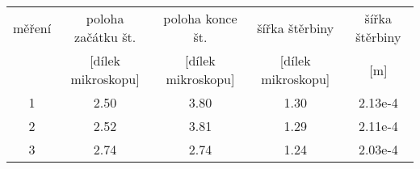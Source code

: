 \begin{tabular}[t]{
  S[table-format = 1.0]
  S[table-format = 1.2]
  S[table-format = 1.2]
  S[table-format = 1.2]
  S[table-format = 1.2e1]
} \toprule
{měření} & {poloha začátku št.} & {poloha konce št.} & {šířka štěrbiny}     & {šířka štěrbiny} \\
         & {[dílek mikroskopu]}      & {[dílek mikroskopu]}    & {[dílek mikroskopu]} & {[m]}            \\        & 2.50                      & 3.80                    & 1.30                 & 2.13e-4          \\
2        & 2.52                      & 3.81                    & 1.29                 & 2.11e-4          \\
3        & 2.74                      & 2.74                    & 1.24                 & 2.03e-4          \\\bottomrule
\end{tabular}
